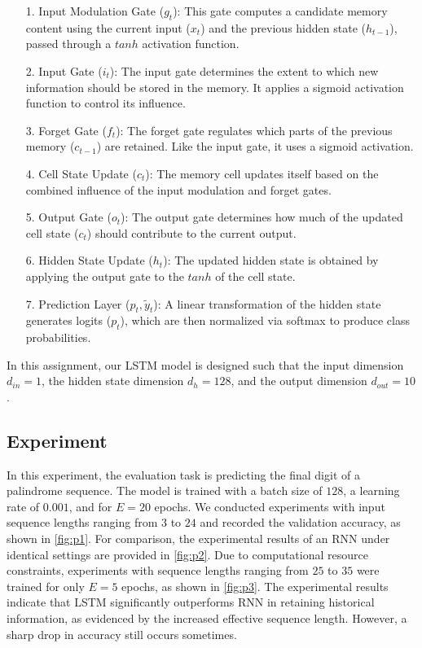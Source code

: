 \documentclass[12pt]{article}
\begin{document}
\begin{itemize}
    \item [1.] Input Modulation Gate (\(g_t\)):  
    This gate computes a candidate memory content using the current input (\(x_t\)) and the previous hidden state (\(h_{t-1}\)), passed through a \(tanh\) activation function.
    
    \item [2.] Input Gate (\(i_t\)):  
    The input gate determines the extent to which new information should be stored in the memory. It applies a sigmoid activation function to control its influence.
    
    \item [3.] Forget Gate (\(f_t\)):  
    The forget gate regulates which parts of the previous memory (\(c_{t-1}\)) are retained. Like the input gate, it uses a sigmoid activation.
    
    \item [4.] Cell State Update (\(c_t\)):  
    The memory cell updates itself based on the combined influence of the input modulation and forget gates. 
    
    \item [5.] Output Gate (\(o_t\)):  
    The output gate determines how much of the updated cell state (\(c_t\)) should contribute to the current output.
    
    \item [6.] Hidden State Update (\(h_t\)):  
    The updated hidden state is obtained by applying the output gate to the \(tanh\) of the cell state.
    
    \item [7.] Prediction Layer (\(p_t, \tilde{y}_t\)):  
    A linear transformation of the hidden state generates logits (\(p_t\)), which are then normalized via softmax to produce class probabilities.
\end{itemize}

In this assignment, our LSTM model is designed such that the input dimension \(d_{in} = 1\), the hidden state dimension \(d_h = 128\), and the output dimension \(d_{out} = 10\). 

\subsection{Experiment}

In this experiment, the evaluation task is predicting the final digit of a palindrome sequence. The model is trained with a batch size of \(128\), a learning rate of \(0.001\), and for \(E = 20\) epochs. We conducted experiments with input sequence lengths ranging from \(3\) to \(24\) and recorded the validation accuracy, as shown in \cref{fig:p1}. For comparison, the experimental results of an RNN under identical settings are provided in \cref{fig:p2}. Due to computational resource constraints, experiments with sequence lengths ranging from \(25\) to \(35\) were trained for only \(E = 5\) epochs, as shown in \cref{fig:p3}. The experimental results indicate that LSTM significantly outperforms RNN in retaining historical information, as evidenced by the increased effective sequence length. However, a sharp drop in accuracy still occurs sometimes.
\end{document}
